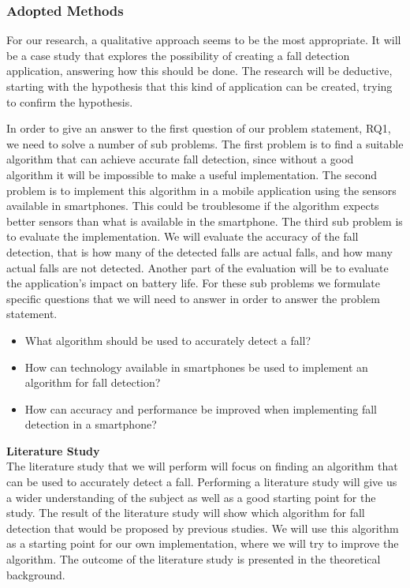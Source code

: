 \documentclass[12pt, a4paper, onecolumn]{article}
\newcommand{\parag}[1]{
	\textbf{#1} \hspace{0pt} \\
}
\begin{document}
	\subsubsection{Adopted Methods}
	
	For our research, a qualitative approach seems to be the most appropriate. It will be a case study that explores the possibility of creating a fall detection application, answering how this should be done. The research will be deductive, starting with the hypothesis that this kind of application can be created, trying to confirm the hypothesis. 
	
	In order to give an answer to the first question of our problem statement, RQ1, we need to solve a number of sub problems. The first problem is to find a suitable algorithm that can achieve accurate fall detection, since without a good algorithm it will be impossible to make a useful implementation. The second problem is to implement this algorithm in a mobile application using the sensors available in smartphones. This could be troublesome if the algorithm expects better sensors than what is available in the smartphone. The third sub problem is to evaluate the implementation. We will evaluate the accuracy of the fall detection, that is how many of the detected falls are actual falls, and how many actual falls are not detected. Another part of the evaluation will be to evaluate the application's impact on battery life. For these sub problems we formulate specific questions that we will need to answer in order to answer the problem statement.
	
	\begin{itemize}
		\item What algorithm should be used to accurately detect a fall?
		\item How can technology available in smartphones be used to implement an algorithm for fall detection?
		\item How can accuracy and performance be improved when implementing fall detection in a smartphone?
	\end{itemize}
	
	\parag{Literature Study}
	The literature study that we will perform will focus on finding an algorithm that can be used to accurately detect a fall. Performing a literature study will give us a wider understanding of the subject as well as a good starting point for the study. The result of the literature study will show which algorithm for fall detection that would be proposed by previous studies. We will use this algorithm as a starting point for our own implementation, where we will try to improve the algorithm. The outcome of the literature study is presented in the theoretical background.
	
\end{document}
